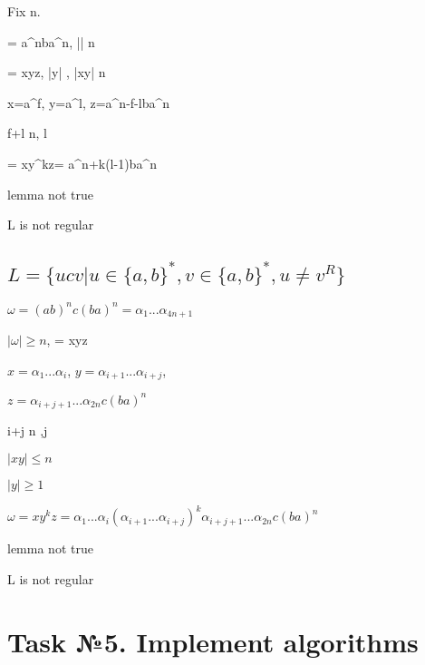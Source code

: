 \documentclass{article}
\begin{document}
Fix n. 

\omega = a^{n}ba^{n}, |\omega| \geq n 

\omega = xyz,  |y|  , |xy| \leq n

x=a^{f},  y=a^{l},  z=a^{n-f-l}ba^{n}

f+l \leq n, l

\omega = xy^{k}z= a^{n+k(l-1)}ba^{n}


lemma not true

L is not regular


\subsection{$L=\{ucv | u \in \{a,b \}^{*}, v \in \{a,b \}^{*}, u \neq v^{R} \}$}

$\omega =(ab)^{n}c(ba)^{n}=\alpha_{1}...\alpha_{4n+1}$

 $|\omega| \geq n $,
\omega = xyz

$x=\alpha_{1}...\alpha_{i}$, $y=\alpha_{i+1}...\alpha_{i+j}$,

$z=\alpha_{i+j+1}...\alpha_{2n}c(ba)^{n}$

i+j \leq n ,j 

$|xy| \leq n$

$|y| \geq 1$

$\omega = xy^{k}z=\alpha_{1}...\alpha_{i}(\alpha_{i+1}...\alpha_{i+j})^{k}\alpha_{i+j+1}...\alpha_{2n}c(ba)^{n} $

lemma not true

L is not regular


\section{Task №5. Implement algorithms}
\end{document}
